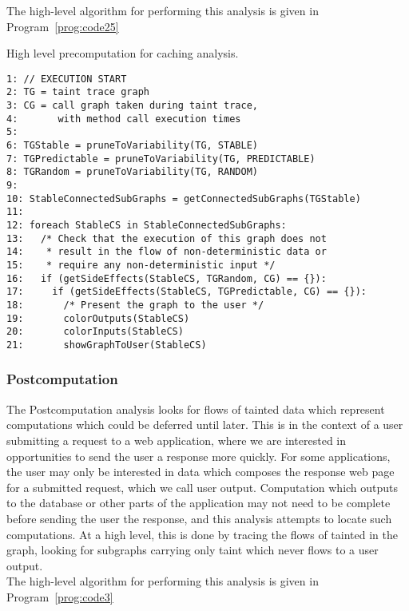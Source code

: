 \documentclass[msc,oneside]{ubcthesis}
\begin{document}
The high-level algorithm for performing this analysis is given in Program~\ref{prog:code25}

\begin{Program}
  \caption{\label{prog:code25} High level precomputation for caching analysis.}
\begin{verbatim}
1: // EXECUTION START
2: TG = taint trace graph
3: CG = call graph taken during taint trace, 
4:       with method call execution times
5:    
6: TGStable = pruneToVariability(TG, STABLE)
7: TGPredictable = pruneToVariability(TG, PREDICTABLE)
8: TGRandom = pruneToVariability(TG, RANDOM)
9: 
10: StableConnectedSubGraphs = getConnectedSubGraphs(TGStable)
11: 
12: foreach StableCS in StableConnectedSubGraphs:
13:   /* Check that the execution of this graph does not 
14:    * result in the flow of non-deterministic data or 
15:    * require any non-deterministic input */
16:   if (getSideEffects(StableCS, TGRandom, CG) == {}):
17:     if (getSideEffects(StableCS, TGPredictable, CG) == {}):
18:       /* Present the graph to the user */
19:       colorOutputs(StableCS)
20:       colorInputs(StableCS)
21:       showGraphToUser(StableCS)
\end{verbatim}
\end{Program}

\subsubsection{Postcomputation}
The Postcomputation analysis looks for flows of tainted data which represent computations which could be deferred until later. This is in the context of a user submitting a request to a web application, where we are interested in opportunities to send the user a response more quickly. For some applications, the user may only be interested in data which composes the response web page for a submitted request, which we call user output. Computation which outputs to the database or other parts of the application may not need to be complete before sending the user the response, and this analysis attempts to locate such computations. At a high level, this is done by tracing the flows of tainted in the graph, looking for subgraphs carrying only taint which never flows to a user output.\\

The high-level algorithm for performing this analysis is given in Program~\ref{prog:code3}
\end{document}
